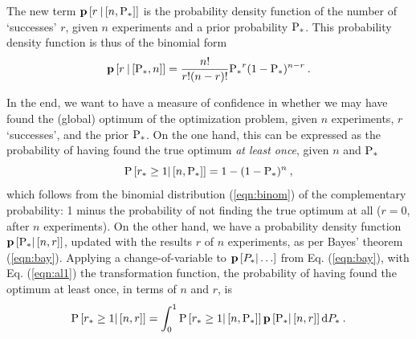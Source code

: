 \documentclass[11pt]{article}
\begin{document}
The new term $\p\left[ r \: | \left[ n, \P_\ast \right]  \right]$ is the probability density function of the number of `successes' $r$, given $n$ experiments and a prior probability $\P_\ast$. This probability density function is thus of the binomial form
\begin{equation}
\label{eqn:binom}
\p\left[ r \: | \left[ \P_\ast , n \right] \right] = \frac{n!}{r! (n - r)!} {\P_\ast}^r ( 1 - \P_\ast)^{n - r} \: .
\end{equation}

In the end, we want to have a measure of confidence in whether we may have found the (global) optimum of the optimization problem, given $n$ experiments, $r$ `successes', and the prior $\P_\ast$. On the one hand, this can be expressed as the probability of having found the true optimum \emph{at least once}, given $n$ and $\P_\ast$ 
\begin{equation}
\label{eqn:al1}
\P \left[ r_\ast \ge 1 | \left[ n, \P_\ast \right] \right] = 1- (1 - \P_\ast)^n \:,
\end{equation}
which follows from the binomial distribution (\ref{eqn:binom}) of the complementary probability: 1 minus the probability of not finding the true optimum at all ($r=0$, after $n$ experiments). On the other hand, we have a probability density function $\p\left[\P_\ast | \left[ n, r \right] \right]$, updated with the results $r$ of $n$ experiments, as per Bayes' theorem (\ref{eqn:bay}). Applying a change-of-variable \cite{dekking2005} to $\p\left[P_\ast | \ldots\right]$ from Eq. (\ref{eqn:bay}), with Eq. (\ref{eqn:al1}) the transformation function, the probability of having found the optimum at least once, in terms of $n$ and $r$, is
\begin{equation}
\label{eqn:al2}
\P \left[ r_\ast \ge 1 | \left[ n, r \right] \right] = \int^1_0 \P \left[ r_\ast \ge 1 | \left[ n, \P_\ast \right] \right] \p\left[\P_\ast | \left[ n, r \right] \right] \textrm{d}P_\ast \:.
\end{equation}
\end{document}
